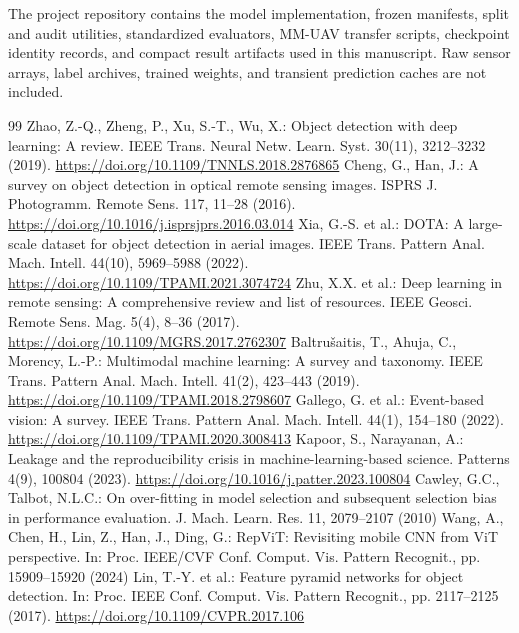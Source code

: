 The project repository contains the model implementation, frozen manifests, split and audit utilities, standardized evaluators, MM-UAV transfer scripts, checkpoint identity records, and compact result artifacts used in this manuscript. Raw sensor arrays, label archives, trained weights, and transient prediction caches are not included.

\sloppy
\begin{thebibliography}{99}
 Zhao, Z.-Q., Zheng, P., Xu, S.-T., Wu, X.: Object detection with deep learning: A review. IEEE Trans. Neural Netw. Learn. Syst. 30(11), 3212--3232 (2019). \url{https://doi.org/10.1109/TNNLS.2018.2876865}
 Cheng, G., Han, J.: A survey on object detection in optical remote sensing images. ISPRS J. Photogramm. Remote Sens. 117, 11--28 (2016). \url{https://doi.org/10.1016/j.isprsjprs.2016.03.014}
 Xia, G.-S. et al.: DOTA: A large-scale dataset for object detection in aerial images. IEEE Trans. Pattern Anal. Mach. Intell. 44(10), 5969--5988 (2022). \url{https://doi.org/10.1109/TPAMI.2021.3074724}
 Zhu, X.X. et al.: Deep learning in remote sensing: A comprehensive review and list of resources. IEEE Geosci. Remote Sens. Mag. 5(4), 8--36 (2017). \url{https://doi.org/10.1109/MGRS.2017.2762307}
 Baltru\v{s}aitis, T., Ahuja, C., Morency, L.-P.: Multimodal machine learning: A survey and taxonomy. IEEE Trans. Pattern Anal. Mach. Intell. 41(2), 423--443 (2019). \url{https://doi.org/10.1109/TPAMI.2018.2798607}
 Gallego, G. et al.: Event-based vision: A survey. IEEE Trans. Pattern Anal. Mach. Intell. 44(1), 154--180 (2022). \url{https://doi.org/10.1109/TPAMI.2020.3008413}
 Kapoor, S., Narayanan, A.: Leakage and the reproducibility crisis in machine-learning-based science. Patterns 4(9), 100804 (2023). \url{https://doi.org/10.1016/j.patter.2023.100804}
 Cawley, G.C., Talbot, N.L.C.: On over-fitting in model selection and subsequent selection bias in performance evaluation. J. Mach. Learn. Res. 11, 2079--2107 (2010)
 Wang, A., Chen, H., Lin, Z., Han, J., Ding, G.: RepViT: Revisiting mobile CNN from ViT perspective. In: Proc. IEEE/CVF Conf. Comput. Vis. Pattern Recognit., pp. 15909--15920 (2024)
 Lin, T.-Y. et al.: Feature pyramid networks for object detection. In: Proc. IEEE Conf. Comput. Vis. Pattern Recognit., pp. 2117--2125 (2017). \url{https://doi.org/10.1109/CVPR.2017.106}

\end{thebibliography}
